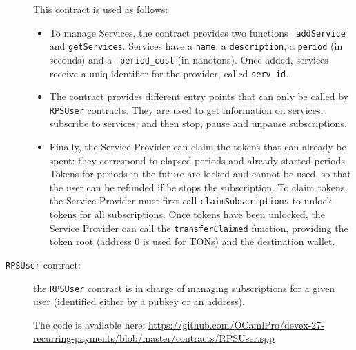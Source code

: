 \documentclass[10pt,a4paper]{article}
\begin{document}
\begin{description}
  This contract is used as follows:
  \begin{itemize}
  \item To manage Services, the contract provides two functions {\tt
    addService} and {\tt getServices}. Services have a {\tt name}, a
    {\tt description}, a {\tt period} (in seconds) and a {\tt
      period\_cost} (in nanotons). Once added, services receive a uniq
    identifier for the provider, called {\tt serv\_id}.
  \item The contract provides different entry points that can only be
    called by {\tt RPSUser} contracts. They are used to get
    information on services, subscribe to services, and then stop,
    pause and unpause subscriptions.
  \item Finally, the Service Provider can claim the tokens that can
    already be spent: they correspond to elapsed periods and already
    started periods. Tokens for periods in the future are locked and
    cannot be used, so that the user can be refunded if he stops the
    subscription. To claim tokens, the Service Provider must first
    call {\tt claimSubscriptions} to unlock tokens for all
    subscriptions. Once tokens have been unlocked, the Service
    Provider can call the {\tt transferClaimed} function, providing
    the token root (address 0 is used for TONs) and the destination
    wallet.
  \end{itemize}
  
\item[{\tt RPSUser} contract:] the {\tt RPSUser} contract is in charge
  of managing subscriptions for a given user (identified either by a
  pubkey or an address).
  
  The code is available here: \url{https://github.com/OCamlPro/devex-27-recurring-payments/blob/master/contracts/RPSUser.spp}


\end{description}
\end{document}
